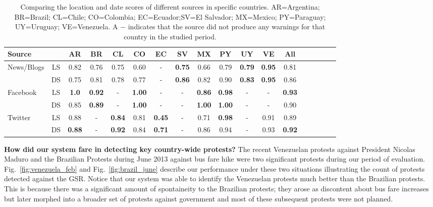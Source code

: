 \documentclass[letterpaper]{article}
\begin{document}
\begin{table} %
\centering
\small
\caption{\small Comparing the location and date scores of different sources in specific countries.
AR=Argentina; BR=Brazil; CL=Chile; CO=Colombia; EC=Ecuador;SV=El Salvador; MX=Mexico; PY=Paraguay; UY=Uruguay; VE=Venezuela. A $-$ indicates that the source did not produce any warnings for that country in the studied period.}
\label{tb:modelwisecomparison}
\begin{tabular}{||l|*{17}{c|}}
\hline
Source& & AR & BR & CL & CO & EC & SV & MX & PY & UY & VE & All\\
\hline
\multirow{2}{*}{News/Blogs} &LS &0.82&0.76&0.75&0.60&-&{\bf0.75}&0.66&0.79&{\bf0.79}&{\bf0.95}&0.81\\
                            &DS&0.75&0.81&0.78&0.77&-&{\bf0.86}&0.82&0.90&{\bf0.83}&{\bf0.95}&0.86\\
\hline
\multirow{2}{*}{Facebook} &LS &{\bf1.0}&{\bf0.92}&-&{\bf1.00}&-&-&{\bf0.86}&{\bf0.98}&-&-&{\bf0.93}\\
                          &DS&0.85&{\bf0.89}&-&{\bf1.00}&-&-&{\bf1.00}&{\bf1.00}&-&-&0.90\\
\hline
\multirow{2}{*}{Twitter} &LS &0.88&-&{\bf0.84}&0.81&{\bf0.45}&-&0.71&{\bf0.98}&-&0.91&0.89\\
                         &DS&{\bf0.88}&-&{\bf0.92}&0.84&{\bf0.71}&-&0.86&0.94&-&0.93&{\bf0.92}\\
\hline
\end{tabular}
\vspace{-4mm}
\end{table}
\vspace{-1em}
\noindent
{\bf How did our system fare in detecting key country-wide protests?}
The recent Venezuelan protests against President Nicolas Maduro and the Brazilian Protests during June 2013 against bus fare hike were two significant protests during our period of evaluation. Fig.~\ref{fig:venezuela_feb} and
Fig.~\ref{fig:brazil_june} describe our performance under these two situations illustrating the count
of protests detected against the GSR. Notice that our system was able to 
identify the Venezuelan protests much better than the Brazilian protests. This is because there was a significant amount
of spontaineity to the Brazilian protests; they arose as discontent about bus fare increases but later morphed into a broader
set of protests against government and most of these subsequent protests were not planned.\\
\end{document}
